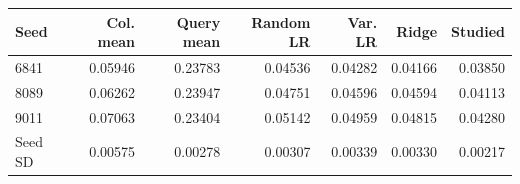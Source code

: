 
\begin{tabular}{lrrrrrr}
\toprule
Seed & Col. mean & Query mean & Random LR & Var. LR & Ridge & Studied \\
\midrule
6841 & 0.05946 & 0.23783 & 0.04536 & 0.04282 & 0.04166 & 0.03850 \\
8089 & 0.06262 & 0.23947 & 0.04751 & 0.04596 & 0.04594 & 0.04113 \\
9011 & 0.07063 & 0.23404 & 0.05142 & 0.04959 & 0.04815 & 0.04280 \\
\midrule
Seed SD & 0.00575 & 0.00278 & 0.00307 & 0.00339 & 0.00330 & 0.00217 \\
\bottomrule
\end{tabular}
